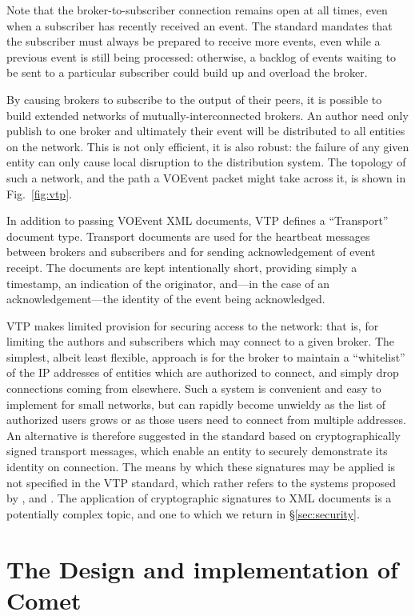 \documentclass[5p,authoryear]{elsarticle}
\begin{document}
Note that the broker-to-subscriber connection remains open at all times, even
when a subscriber has recently received an event. The standard mandates that
the subscriber must always be prepared to receive more events, even while a
previous event is still being processed: otherwise, a backlog of events
waiting to be sent to a particular subscriber could build up and overload the
broker.

By causing brokers to subscribe to the output of their peers, it is possible
to build extended networks of mutually-interconnected brokers. An author need
only publish to one broker and ultimately their event will be distributed to
all entities on the network. This is not only efficient, it is also robust:
the failure of any given entity can only cause local disruption to the
distribution system. The topology of such a network, and the path a VOEvent
packet might take across it, is shown in Fig.~\ref{fig:vtp}.

In addition to passing VOEvent XML documents, VTP defines a ``Transport''
document type. Transport documents are used for the heartbeat messages between
brokers and subscribers and for sending acknowledgement of event receipt. The
documents are kept intentionally short, providing simply a timestamp, an
indication of the originator, and---in the case of an acknowledgement---the
identity of the event being acknowledged.

VTP makes limited provision for securing access to the network: that is, for
limiting the authors and subscribers which may connect to a given broker. The
simplest, albeit least flexible, approach is for the broker to maintain a
``whitelist'' of the IP addresses of entities which are authorized to connect,
and simply drop connections coming from elsewhere. Such a system is convenient
and easy to implement for small networks, but can rapidly become unwieldy as
the list of authorized users grows or as those users need to connect from
multiple addresses. An alternative is therefore suggested in the standard
based on cryptographically signed transport messages, which enable an entity
to securely demonstrate its identity on connection. The means by which these
signatures may be applied is not specified in the VTP standard, which rather
refers to the systems proposed by \citet{Rixon:2005}, \citet{Denny:2008} and
\citet{Allen:2008}.  The application of cryptographic signatures to XML
documents is a potentially complex topic, and one to which we return in
\S\ref{sec:security}.

\section{The Design and implementation of Comet}
\label{sec:design}
\end{document}
